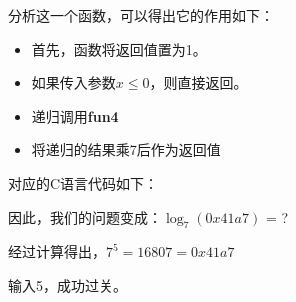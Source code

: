	分析这一个函数，可以得出它的作用如下：
	
	\begin{itemize}
		\item	首先，函数将返回值置为1。
		\item	如果传入参数$x \le 0$，则直接返回。
		\item	递归调用\textbf{fun4}
		\item	将递归的结果乘7后作为返回值
	\end{itemize}
	
	对应的C语言代码如下：
	
	
	因此，我们的问题变成：$\log_7(0x41a7)$ = ?
	
	经过计算得出，$7 ^ 5 = 16807 = 0x41a7$
	
	输入5，成功过关。
